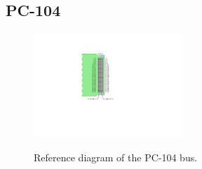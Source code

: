 \subsection{PC-104}

\begin{figure}[!ht]
    \begin{center}
        \includegraphics[width=0.5\textwidth]{figures/pc104-diagram}
        \label{fig:pc104-diagram}
        \caption{Reference diagram of the PC-104 bus.}
    \end{center}
\end{figure}

